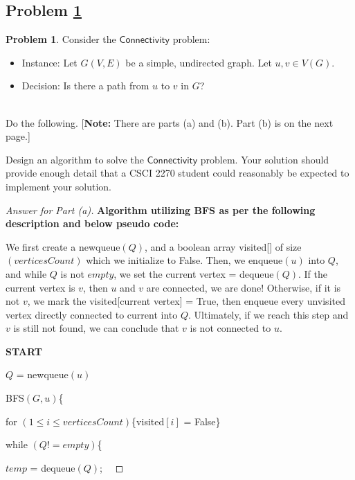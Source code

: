 \documentclass[11pt]{article}
\theoremstyle{definition}
\theoremstyle{definition}
\newtheorem{required}{Problem}
\theoremstyle{definition}
\begin{document}
\subsection{Problem \ref{DFS1}}
\begin{required} \label{DFS1}
Consider the $\textsf{Connectivity}$ problem:
\begin{itemize}
\item \textsf{Instance:} Let $G(V, E)$ be a simple, undirected graph. Let $u, v \in V(G)$.
\item \textsf{Decision:} Is there a path from $u$ to $v$ in $G$?
\end{itemize}

\noindent \\ Do the following. [\textbf{Note:} There are parts (a) and (b). Part (b) is on the next page.]
\begin{enumerate}[label=(\alph*)]
\item Design an algorithm to solve the $\textsf{Connectivity}$ problem. Your solution should provide enough detail that a CSCI 2270 student could reasonably be expected to implement your solution.
\begin{proof}[Answer for Part (a)]
\item \textbf{Algorithm utilizing BFS as per the following description and below pseudo code: \ } 
\item We first create a newqueue$(Q)$, and a boolean array visited[] of size $(verticesCount)$ which we initialize to False. Then, we enqueue$(u)$ into $Q$, and while $Q$ is not $empty$, we set the current vertex = dequeue$(Q)$. If the current vertex is $v$, then $u$ and $v$ are connected, we are done! Otherwise, if it is not $v$, we mark the visited[current vertex] = True, then enqueue every unvisited vertex directly connected to current into $Q$. Ultimately, if we reach this step and $v$ is still not found, we can conclude that $v$ is not connected to $u$. \\
\item \textbf{START} \
\item $Q$ = newqueue$(u)$ \
\item	\hspace*{0mm} BFS$(G, u)$\{
\item	\hspace*{10mm} for $(1 \leq i \leq verticesCount)$\{visited$[i]$ = False\}
\item	\hspace*{10mm} while $(Q != empty)$\{
\item	\hspace*{20mm} $temp$ = dequeue$(Q)$; \

\end{proof}
\end{enumerate}
\end{required}
\end{document}

